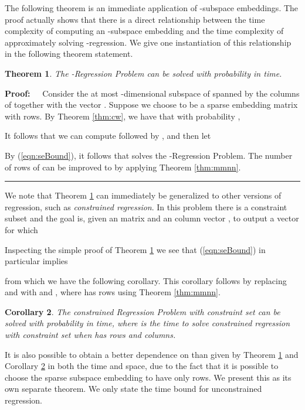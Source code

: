\documentclass[11pt]{article}
\newtheorem{theorem}{Theorem}
\newtheorem{corollary}[theorem]{Corollary}
\newenvironment{proof}{\begin{trivlist} \item {\bf Proof:~~}}
  {\qed\end{trivlist}}
\def\qed{\hfill\rule{2mm}{2mm}}
\begin{document}
The following theorem is an immediate application of -subspace embeddings. The proof actually shows
that there is a direct relationship between the time complexity of computing an -subspace embedding 
and the time complexity of approximately solving -regression. We give one instantiation of this relationship 
in the following theorem statement.
\begin{theorem}\label{thm:regression}
The -Regression Problem can be solved with probability  in  time.
\end{theorem}
\begin{proof}
Consider the at most -dimensional subspace  of  spanned by the columns of  
together with the vector . Suppose we choose  to be a sparse embedding matrix with  rows.
By Theorem \ref{thm:cw}, we have that with probability , 

It follows that we can compute  followed by , and then let

By (\ref{eqn:seBound}), it follows that  solves the -Regression Problem. The number of rows
of  can be improved to  by applying Theorem \ref{thm:mmnn}. 
\end{proof}

We note that Theorem \ref{thm:regression} can immediately be generalized to other versions of regression,
such as {\it constrained regression}. In this problem there is a constraint subset 
and the goal is, given an  matrix  and an  column vector , to output a vector 
for which

Inspecting the simple proof of Theorem \ref{thm:regression} we see that (\ref{eqn:seBound}) in particular implies

from which we have the following corollary. This corollary follows by replacing  and 
with  and , where  has  rows using Theorem \ref{thm:mmnn}. 
\begin{corollary}\label{cor:regression}
The constrained  Regression Problem with constraint set 
can be solved with probability  in  time, 
where  is the time to solve constrained  regression with constraint set  when 
has  rows and  columns. 
\end{corollary}

It is also possible to obtain a better dependence on  than given by Theorem \ref{thm:regression} 
and Corollary \ref{cor:regression} in both the time and space, due to the fact that it is 
possible to choose the sparse subspace embedding
 to have only  rows. We present this as its own separate theorem. We only state the time bound
for unconstrained regression. 
\end{document}
